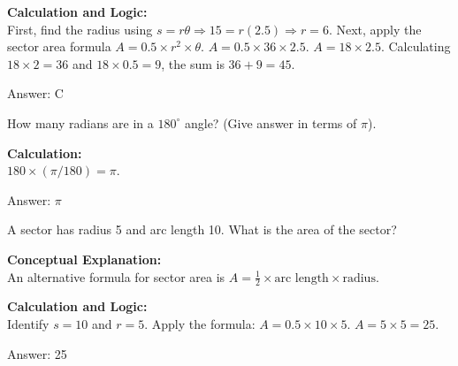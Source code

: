 \documentclass[11pt,paper=a4,answers]{exam}
\begin{document}
\begin{questions}
\begin{solution}
\textbf{Calculation and Logic:} \\
First, find the radius using $s = r\theta \Rightarrow 15 = r(2.5) \Rightarrow r = 6$. Next, apply the sector area formula $A = 0.5 \times r^2 \times \theta$. $A = 0.5 \times 36 \times 2.5$. $A = 18 \times 2.5$. Calculating $18 \times 2 = 36$ and $18 \times 0.5 = 9$, the sum is $36 + 9 = 45$.

\vspace{30pt}

Answer: \colorbox{yellow!100}{C}
\end{solution}

\vspace{60pt}

\question
How many radians are in a $180^\circ$ angle? (Give answer in terms of $\pi$).

\begin{solution}
\textbf{Calculation:} \\
$180 \times (\pi / 180) = \pi$.

\vspace{30pt}

Answer: \colorbox{yellow!100}{$\pi$}
\end{solution}

\vspace{60pt}

\question
A sector has radius 5 and arc length 10. What is the area of the sector?

\begin{solution}
\textbf{Conceptual Explanation:} \\
An alternative formula for sector area is $A = \frac{1}{2} \times \text{arc length} \times \text{radius}$.

\vspace{30pt}

\textbf{Calculation and Logic:} \\
Identify $s = 10$ and $r = 5$. Apply the formula: $A = 0.5 \times 10 \times 5$. $A = 5 \times 5 = 25$.

\vspace{30pt}

Answer: \colorbox{yellow!100}{25}
\end{solution}

\vspace{60pt}


\end{questions}
\end{document}
